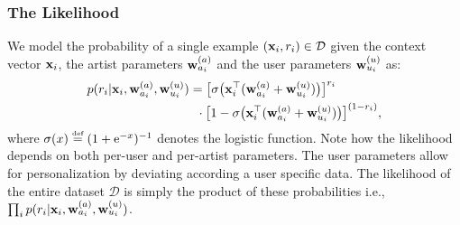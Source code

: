 \subsubsection{The Likelihood}
We model the probability of a single example $(\mathbf{x}_i, r_i) \in \mathcal{D}$ given the context vector $\mathbf{x}_i$,
the artist parameters $\mathbf{w}^{(a)}_{a_i}$ and the user parameters $\mathbf{w}^{(u)}_{u_i}$  as:
\begin{align}
 p( r_i | \mathbf{x}_i , \mathbf{w}^{(a)}_{a_i}, \mathbf{w}^{(u)}_{u_i} )
& =  \big[ \sigma \big( \mathbf{x}_i^\top ( \mathbf{w}^{(a)}_{a_i} + \mathbf{w}^{(u)}_{u_i} ) \big) \big]^{r_i} \nonumber \\ 
& \ \:  \cdot \big[ 1 - \sigma \big( \mathbf{x}_i^\top ( \mathbf{w}^{(a)}_{a_i} + \mathbf{w}^{(u)}_{u_i} ) \big) \big]^{(1-r_i)} ,
\label{eq:likelihood}
\end{align}
where  $\sigma(x) \defined (1 + \mathrm{e}^{-x})^{-1}$ denotes the logistic function. Note how the likelihood depends on both per-user and per-artist parameters. The user parameters allow for personalization by deviating according a user specific data. %
The likelihood of the entire dataset $\mathcal{D}$ is simply the product of these probabilities i.e., $\prod_i p( r_i | \mathbf{x}_i , \mathbf{w}^{(a)}_{a_i}, \mathbf{w}^{(u)}_{u_i})$.


